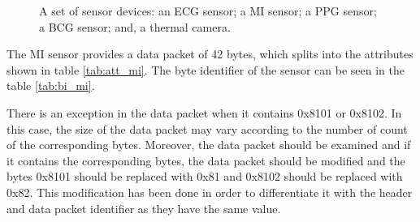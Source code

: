 \begin{figure}
	\hspace{8pt}%
	\caption[A set of four subfigures.]{A set of sensor devices:
		 an ECG sensor;
		 a MI sensor;
		 a PPG sensor;
		 a BCG sensor; and,
		 a thermal camera.}%
	\label{fig:ex3}%
\end{figure}



The MI sensor provides a data packet of 42 bytes, which splits into the attributes shown in table \ref{tab:att_mi}. The byte identifier of the sensor can be seen in the table \ref{tab:bi_mi}.

There is an exception in the data packet when it contains 0x8101 or 0x8102. In this case, the size of the data packet may vary according to the number of count of the corresponding bytes. Moreover, the data packet should be examined and if it contains the corresponding bytes, the data packet should be modified and the bytes 0x8101 should be replaced with 0x81 and 0x8102 should be replaced with 0x82. This modification has been done in order to differentiate it with the header and data packet identifier as they have the same value.


